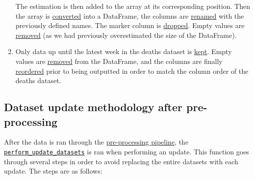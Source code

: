 \documentclass[
  a4paper]{article}
\begin{document}
\begin{enumerate}
  The estimation is then added to the array at its corresponding
  position. Then the array is
  \href{https://github.com/dreth/tfm_uc3m/blob/report_ref/api/functions.py\#L422}{converted}
  into a DataFrame, the columns are
  \href{https://github.com/dreth/tfm_uc3m/blob/report_ref/api/functions.py\#L423}{renamed}
  with the previously defined names. The marker column is
  \href{https://github.com/dreth/tfm_uc3m/blob/report_ref/api/functions.py\#L425}{dropped}.
  Empty values are
  \href{https://github.com/dreth/tfm_uc3m/blob/report_ref/api/functions.py\#L428}{removed}
  (as we had previously overestimated the size of the DataFrame).
\item
  Only data up until the latest week in the deaths dataset is
  \href{https://github.com/dreth/tfm_uc3m/blob/report_ref/api/functions.py\#L431}{kept}.
  Empty values are
  \href{https://github.com/dreth/tfm_uc3m/blob/report_ref/api/functions.py\#L434}{removed}
  from the DataFrame, and the columns are finally
  \href{https://github.com/dreth/tfm_uc3m/blob/report_ref/api/functions.py\#L441}{reordered}
  prior to being outputted in order to match the column order of the
  deaths dataset.
\end{enumerate}

\hypertarget{DatasetUpdateMethodology}{%
\subsection{Dataset update methodology after
pre-processing}\label{DatasetUpdateMethodology}}

After the data is ran through the
\protect\hyperlink{PreProcessingPipeline}{pre-processing pipeline}, the
\href{https://github.com/dreth/tfm_uc3m/blob/report_ref/api/functions.py\#L447-L488}{\texttt{perform\_update\_datasets}}
is ran when performing an update. This function goes through several
steps in order to avoid replacing the entire datasets with each update.
The steps are as follows:
\end{document}
